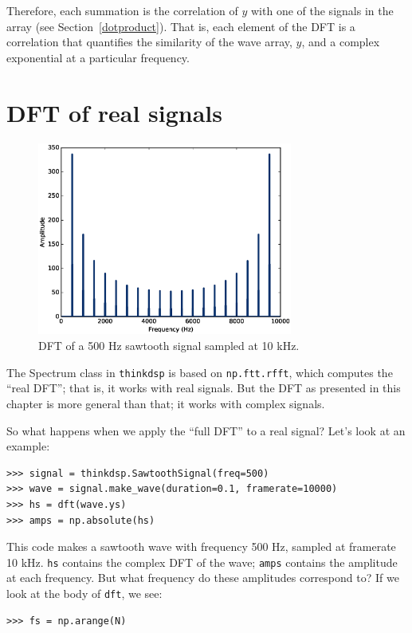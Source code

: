 \documentclass[12pt]{book}
\begin{document}
Therefore, each summation is the correlation of $y$ with one of the
signals in the array (see Section~\ref{dotproduct}).  That is, each
element of the DFT is a correlation that quantifies the similarity of
the wave array, $y$, and a complex exponential at a particular
frequency.


\section{DFT of real signals}

\begin{figure}
\centerline{\includegraphics[height=2.5in]{figs/dft3.eps}}
\caption{DFT of a 500 Hz sawtooth signal sampled at 10 kHz.}
\label{fig.dft3}
\end{figure}

The Spectrum class in {\tt thinkdsp} is based on {\tt np.ftt.rfft},
which computes the ``real DFT''; that is, it works with real signals.
But the DFT as presented in this chapter is more general than that; it
works with complex signals.

So what happens when we apply the ``full DFT'' to a real signal?
Let's look at an example:

\begin{verbatim}
>>> signal = thinkdsp.SawtoothSignal(freq=500)
>>> wave = signal.make_wave(duration=0.1, framerate=10000)
>>> hs = dft(wave.ys)
>>> amps = np.absolute(hs)
\end{verbatim}

This code makes a sawtooth wave with frequency 500 Hz, sampled at
framerate 10 kHz.  {\tt hs} contains the complex DFT of the wave;
{\tt amps} contains the amplitude at each frequency.  But what
frequency do these amplitudes correspond to?  If we look at the
body of {\tt dft}, we see:

\begin{verbatim}
>>> fs = np.arange(N)
\end{verbatim}
\end{document}
